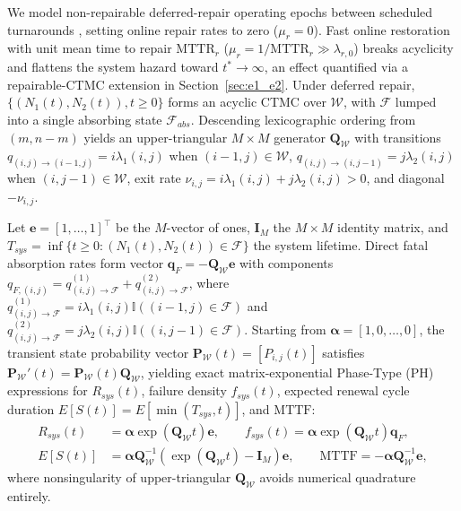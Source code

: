 \documentclass{elektr}
\begin{document}
We model non-repairable deferred-repair operating epochs between scheduled turnarounds \cite{nakagawa2005,amari2008,taghipour2015,mannai2026}, setting online repair rates to zero ($\mu_r = 0$). Fast online restoration with unit mean time to repair $\mathrm{MTTR}_r$ ($\mu_r = 1/\mathrm{MTTR}_r \gg \lambda_{r,0}$) breaks acyclicity and flattens the system hazard toward $t^* \to \infty$, an effect quantified via a repairable-CTMC extension in Section~\ref{sec:e1_e2}. Under deferred repair, $\{(N_1(t), N_2(t)), t \ge 0\}$ forms an acyclic CTMC over $\mathcal{W}$, with $\mathcal{F}$ lumped into a single absorbing state $\mathcal{F}_{abs}$. Descending lexicographic ordering from $(m, n - m)$ yields an upper-triangular $M \times M$ generator $\mathbf{Q}_{\mathcal{W}}$ with transitions $q_{(i,j)\to(i-1,j)} = i\lambda_1(i, j)$ when $(i-1, j) \in \mathcal{W}$, $q_{(i,j)\to(i,j-1)} = j\lambda_2(i, j)$ when $(i, j-1) \in \mathcal{W}$, exit rate $\nu_{i,j} = i\lambda_1(i, j) + j\lambda_2(i, j) > 0$, and diagonal $-\nu_{i,j}$.

Let $\mathbf{e} = [1, \dots, 1]^{\top}$ be the $M$-vector of ones, $\mathbf{I}_M$ the $M \times M$ identity matrix, and $T_{sys} = \inf\{t \ge 0 : (N_1(t), N_2(t)) \in \mathcal{F}\}$ the system lifetime. Direct fatal absorption rates form vector $\mathbf{q}_F = -\mathbf{Q}_{\mathcal{W}}\mathbf{e}$ with components $q_{F,(i,j)} = q_{(i,j)\to\mathcal{F}}^{(1)} + q_{(i,j)\to\mathcal{F}}^{(2)}$, where $q_{(i,j)\to\mathcal{F}}^{(1)} = i\lambda_1(i, j)\mathbb{I}((i-1, j) \in \mathcal{F})$ and $q_{(i,j)\to\mathcal{F}}^{(2)} = j\lambda_2(i, j)\mathbb{I}((i, j-1) \in \mathcal{F})$. Starting from $\boldsymbol{\alpha} = [1, 0, \dots, 0]$, the transient state probability vector $\mathbf{P}_{\mathcal{W}}(t) = [P_{i,j}(t)]$ satisfies $\mathbf{P}_{\mathcal{W}}'(t) = \mathbf{P}_{\mathcal{W}}(t)\mathbf{Q}_{\mathcal{W}}$, yielding exact matrix-exponential Phase-Type (PH) expressions for $R_{sys}(t)$, failure density $f_{sys}(t)$, expected renewal cycle duration $E[S(t)] = E[\min(T_{sys}, t)]$, and $\mathrm{MTTF}$:
\begin{align}
R_{sys}(t) &= \boldsymbol{\alpha} \exp(\mathbf{Q}_{\mathcal{W}} t) \mathbf{e}, \qquad f_{sys}(t) = \boldsymbol{\alpha} \exp(\mathbf{Q}_{\mathcal{W}} t) \mathbf{q}_F, \label{eq:R_f} \\
E[S(t)] &= \boldsymbol{\alpha} \mathbf{Q}_{\mathcal{W}}^{-1} \left( \exp(\mathbf{Q}_{\mathcal{W}} t) - \mathbf{I}_M \right) \mathbf{e}, \qquad \mathrm{MTTF} = -\boldsymbol{\alpha} \mathbf{Q}_{\mathcal{W}}^{-1} \mathbf{e}, \label{eq:ES_MTTF}
\end{align}
where nonsingularity of upper-triangular $\mathbf{Q}_{\mathcal{W}}$ avoids numerical quadrature entirely.
\end{document}
